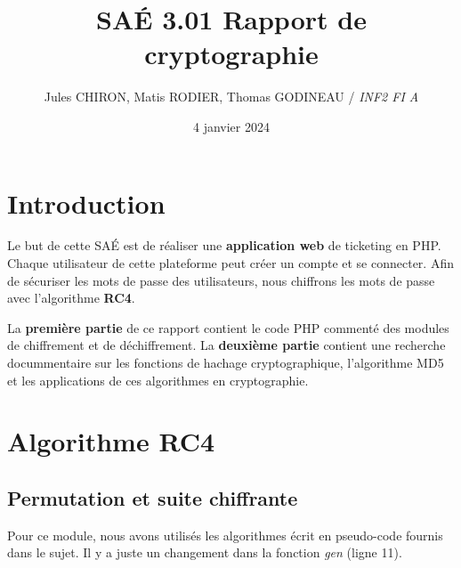 \documentclass[12pt, a4paper]{article}
\title{SAÉ 3.01 Rapport de cryptographie}
\author{Jules CHIRON, Matis RODIER, Thomas GODINEAU / \textit{INF2 FI A}}
\date{4 janvier 2024}
\begin{document}
\maketitle


\tableofcontents{}
\section*{Introduction}

Le but de cette SAÉ est de réaliser une \textbf{application web} de ticketing en PHP.\@
Chaque utilisateur de cette plateforme peut créer un compte et se connecter.
Afin de sécuriser les mots de passe des utilisateurs, nous chiffrons les mots de passe avec l'algorithme \textbf{RC4}.
\bigskip

La \textbf{première partie} de ce rapport contient le code PHP commenté des modules de chiffrement et de déchiffrement.
La \textbf{deuxième partie} contient une recherche docummentaire sur les fonctions de hachage cryptographique,
l'algorithme MD5 et les applications de ces algorithmes en cryptographie.

\section{Algorithme RC4}

\subsection*{Permutation et suite chiffrante}

Pour ce module,
nous avons utilisés les algorithmes écrit en pseudo-code fournis dans le sujet.
Il y a juste un changement dans la fonction \textit{gen} (ligne 11).

\end{document}
